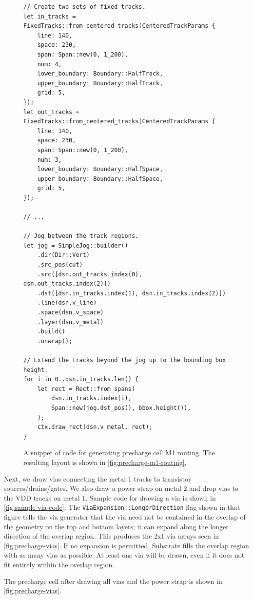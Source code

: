 \begin{figure}[H] \centering
\begin{verbatim}
// Create two sets of fixed tracks.
let in_tracks = FixedTracks::from_centered_tracks(CenteredTrackParams {
    line: 140,
    space: 230,
    span: Span::new(0, 1_200),
    num: 4,
    lower_boundary: Boundary::HalfTrack,
    upper_boundary: Boundary::HalfTrack,
    grid: 5,
});
let out_tracks = FixedTracks::from_centered_tracks(CenteredTrackParams {
    line: 140,
    space: 230,
    span: Span::new(0, 1_200),
    num: 3,
    lower_boundary: Boundary::HalfSpace,
    upper_boundary: Boundary::HalfSpace,
    grid: 5,
});

// ...

// Jog between the track regions.
let jog = SimpleJog::builder()
    .dir(Dir::Vert)
    .src_pos(cut)
    .src([dsn.out_tracks.index(0), dsn.out_tracks.index(2)])
    .dst([dsn.in_tracks.index(1), dsn.in_tracks.index(2)])
    .line(dsn.v_line)
    .space(dsn.v_space)
    .layer(dsn.v_metal)
    .build()
    .unwrap();

// Extend the tracks beyond the jog up to the bounding box height.
for i in 0..dsn.in_tracks.len() {
    let rect = Rect::from_spans(
        dsn.in_tracks.index(i),
        Span::new(jog.dst_pos(), bbox.height()),
    );
    ctx.draw_rect(dsn.v_metal, rect);
}
\end{verbatim}
\caption{A snippet of code for generating precharge cell M1 routing.
The resulting layout is shown in \ref{fig:precharge-m1-routing}. \label{fig:precharge-m1-routing-code}}
\end{figure}


Next, we draw vias connecting the metal 1 tracks to transistor sources/drains/gates.
We also draw a power strap on metal 2 and drop vias to the VDD tracks on metal 1.
Sample code for drawing a via is shown in \ref{fig:sample-via-code}.
The \verb|ViaExpansion::LongerDirection| flag shown in that figure tells the via generator
that the via need not be contained in the overlap of the geometry on the top and bottom layers;
it can expand along the longer direction of the overlap region. This produces the 2x1 via arrays
seen in \ref{fig:precharge-vias}. If no expansion is permitted, Substrate fills the overlap region with as many
vias as possible. At least one via will be drawn, even if it does not fit entirely within the overlap region.

The precharge cell after drawing all vias and the power strap is shown in \ref{fig:precharge-vias}.

